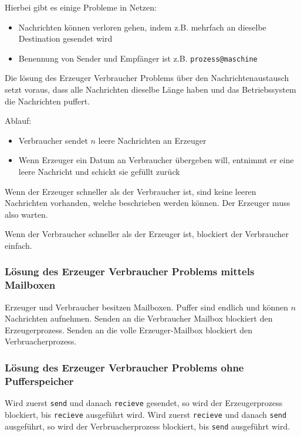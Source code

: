 Hierbei gibt es einige Probleme in Netzen:

\begin{itemize}
    \item Nachrichten können verloren gehen, indem z.B. mehrfach an dieselbe Destination
          gesendet wird
    \item Benennung von Sender und Empfänger ist z.B. \texttt{prozess@maschine}
\end{itemize}

Die lösung des Erzeuger Verbraucher Problems über den Nachrichtenaustausch
setzt voraus, dass alle Nachrichten dieselbe Länge haben und das Betriebssystem
die Nachrichten puffert.

Ablauf:

\begin{itemize}
    \item Verbraucher sendet $n$ leere Nachrichten an Erzeuger
    \item Wenn Erzeuger ein Datum an Verbraucher übergeben will, entnimmt er eine leere
          Nachricht und schickt sie gefüllt zurück
\end{itemize}

Wenn der Erzeuger schneller als der Verbraucher ist, sind keine leeren
Nach\-rich\-ten vorhanden, welche beschrieben werden können. Der Erzeuger muss
also warten.

Wenn der Verbraucher schneller als der Erzeuger ist, blockiert der Verbraucher
einfach.

\subsubsection{Lösung des Erzeuger Verbraucher Problems mittels Mailboxen}

Erzeuger und Verbraucher besitzen Mailboxen. Puffer sind endlich und können $n$
Nachrichten aufnehmen. Senden an die Verbraucher Mailbox blockiert den
Erzeugerprozess. Senden an die volle Erzeuger-Mailbox blockiert den
Verbruacherprozess.

\subsubsection{Lösung des Erzeuger Verbraucher Problems ohne Pufferspeicher}

Wird zuerst \texttt{send} und danach \texttt{recieve} gesendet, so wird der
Erzeugerprozess blockiert, bis \texttt{recieve} ausgeführt wird. Wird zuerst
\texttt{recieve} und danach \texttt{send} ausgeführt, so wird der
Verbruacherprozess blockiert, bis \texttt{send} ausgeführt wird.

